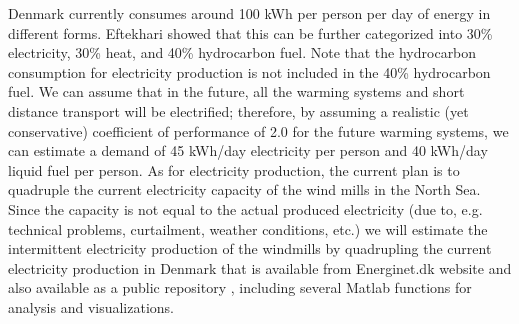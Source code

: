 \documentclass{ECOS_2021}
\begin{document}
Denmark currently consumes around 100 kWh per person per day of energy
in different forms. Eftekhari \cite{eftekhariQuantifyingRoleLiquid2020}
showed that this can be further categorized into 30\% electricity,
30\% heat, and 40\% hydrocarbon fuel. Note that the hydrocarbon consumption
for electricity production is not included in the 40\% hydrocarbon
fuel. We can assume that in the future, all the warming systems and
short distance transport will be electrified; therefore, by assuming
a realistic (yet conservative) coefficient of performance of 2.0 for
the future warming systems, we can estimate a demand of 45 kWh/day
electricity per person and 40 kWh/day liquid fuel per person. As for
electricity production, the current plan is to quadruple the current
electricity capacity of the wind mills in the North Sea. Since the
capacity is not equal to the actual produced electricity (due to,
e.g. technical problems, curtailment, weather conditions, etc.) we
will estimate the intermittent electricity production of the windmills
by quadrupling the current electricity production in Denmark that
is available from Energinet.dk website and also available as a public
repository \cite{eftekhariSimulkadeStorageFirst2021}, including several
Matlab functions for analysis and visualizations.
\end{document}
